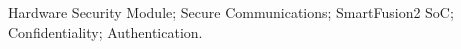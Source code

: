\noindent Hardware Security Module; Secure Communications; SmartFusion2 SoC; Confidentiality; Authentication.
